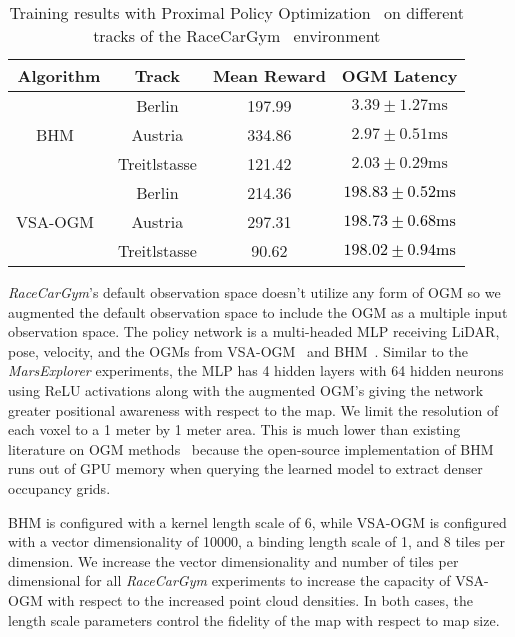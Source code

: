 \begingroup
\renewcommand{\arraystretch}{1.2}
\begin{table}[]
\centering
\caption{Training results with Proximal Policy Optimization~\cite{schulman2017proximalpolicyoptimizationalgorithms} on different tracks of the RaceCarGym~\cite{Brunnbauer_racecar_gym} environment}
\label{tab:racecar-results}
\begin{tabular}{cccc}
\toprule
\textbf{Algorithm} & \textbf{Track} & \textbf{Mean Reward} & \textbf{OGM Latency} \\
\midrule
                                  & Berlin       & 197.99  & $3.39\pm1.27\text{ms}$       \\
BHM~\cite{senanayake2017bayesian} & Austria      & 334.86  & $2.97\pm0.51\text{ms}$         \\
                                  & Treitlstasse & 121.42  & $2.03\pm0.29\text{ms}$         \\
\midrule
                               & Berlin       & 214.36  & \textcolor{black}{$198.83\pm0.52\text{ms}$}  \\
VSA-OGM~\cite{snyder2024brain} & Austria      & 297.31  & \textcolor{black}{$198.73\pm0.68\text{ms}$}  \\
                               & Treitlstasse & 90.62   & \textcolor{black}{$198.02\pm0.94\text{ms}$}  \\ 
\bottomrule
\end{tabular}
\end{table}
\endgroup



\textit{RaceCarGym}'s default observation space doesn't utilize any form of OGM so we augmented the default observation space to include the OGM as a multiple input observation space. The policy network is a multi-headed MLP receiving LiDAR, pose, velocity, and the OGMs from VSA-OGM~\cite{snyder2024brain} and BHM~\cite{senanayake2017bayesian}. Similar to the \textit{MarsExplorer} experiments, the MLP has 4 hidden layers with 64 hidden neurons using ReLU activations along with the augmented OGM's giving the network greater positional awareness with respect to the map. We limit the resolution of each voxel to a 1 meter by 1 meter area. This is much lower than existing literature on OGM methods~\cite{wilson2022convolutional} because the open-source implementation of BHM runs out of GPU memory when querying the learned model to extract denser occupancy grids.

BHM is configured with a kernel length scale of 6, while VSA-OGM is configured with a vector dimensionality of 10000, a binding length scale of 1, and 8 tiles per dimension. We increase the vector dimensionality and number of tiles per dimensional for all \textit{RaceCarGym} experiments to increase the capacity of VSA-OGM with respect to the increased point cloud densities. In both cases, the length scale parameters control the fidelity of the map with respect to map size.

